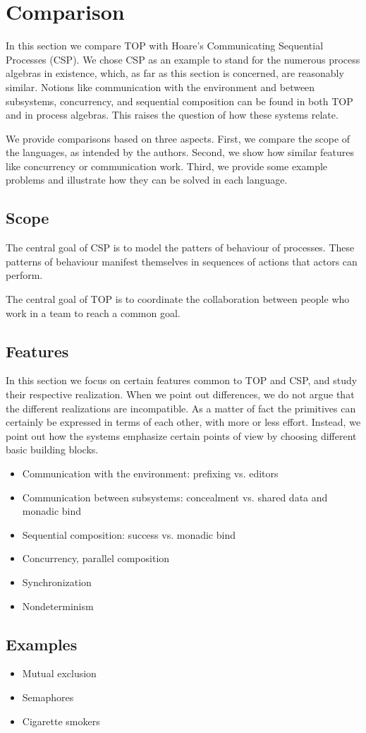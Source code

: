 
\section{Comparison}

In this section we compare TOP with Hoare's Communicating Sequential Processes (CSP).
We chose CSP as an example to stand for the numerous process algebras in existence, which, as far as this section is concerned, are reasonably similar.
Notions like communication with the environment and between subsystems, concurrency, and sequential composition can be found in both TOP and in process algebras.
This raises the question of how these systems relate.

We provide comparisons based on three aspects.
First, we compare the scope of the languages, as intended by the authors.
Second, we show how similar features like concurrency or communication work.
Third, we provide some example problems and illustrate how they can be solved in each language.

\subsection{Scope}

The central goal of CSP is to model the patters of behaviour of processes.
These patterns of behaviour manifest themselves in sequences of actions that actors can perform.

The central goal of TOP is to coordinate the collaboration between people who work in a team to reach a common goal.

\subsection{Features}

In this section we focus on certain features common to TOP and CSP, and study their respective realization.
When we point out differences, we do not argue that the different realizations are incompatible.
As a matter of fact the primitives can certainly be expressed in terms of each other, with more or less effort.
Instead, we point out how the systems emphasize certain points of view by choosing different basic building blocks.

\begin{itemize}
\item Communication with the environment: prefixing vs. editors
\item Communication between subsystems: concealment vs. shared data and monadic bind
\item Sequential composition: success vs. monadic bind
\item Concurrency, parallel composition
\item Synchronization
\item Nondeterminism
\end{itemize}

\subsection{Examples}

\begin{itemize}
\item Mutual exclusion
\item Semaphores
\item Cigarette smokers
\end{itemize}
